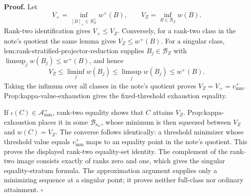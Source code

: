 \textbf{Proof.}
Let
\[
V_+=\inf_{[B]_+\in\mathcal B_Z^+}w^+(B),
\qquad V_Z=\inf_{B\in\mathcal B_Z}w(B).
\]
Rank-two identification gives \(V_+\le V_Z\).  Conversely, for a rank-two class in the note's quotient the same lemma gives \(V_Z\le w^+(B)\).  For a singular class, lem:rank-stratified-projector-reduction supplies \(B_j\in\mathcal B_Z\) with \(\limsup_jw(B_j)\le w^+(B)\), and hence
\[
V_Z\le\liminf_jw(B_j)\le\limsup_jw(B_j)\le w^+(B).
\]
Taking the infimum over all classes in the note's quotient proves \(V_Z=V_+=v_{\mathrm{mm}}^+\).  Prop:kappa-value-exhaustion gives the fixed-threshold exhaustion equality.

If \(\iota(C)\in\mathcal A_{\mathrm{mm}}^+\), rank-two equality shows that \(C\) attains \(V_Z\).  Prop:kappa-exhaustion places it in some \(\mathcal B_{\kappa_C}\), whose minimum is then squeezed between \(V_Z\) and \(w(C)=V_Z\).  The converse follows identically: a threshold minimizer whose threshold value equals \(v_{\mathrm{mm}}^+\) maps to an equality point in the note's quotient.  This proves the displayed rank-two equality-set identity.  The complement of the rank-two image consists exactly of ranks zero and one, which gives the singular equality-stratum formula.  The approximation argument supplies only a minimizing sequence at a singular point; it proves neither full-class nor ordinary attainment. \(\square\)
